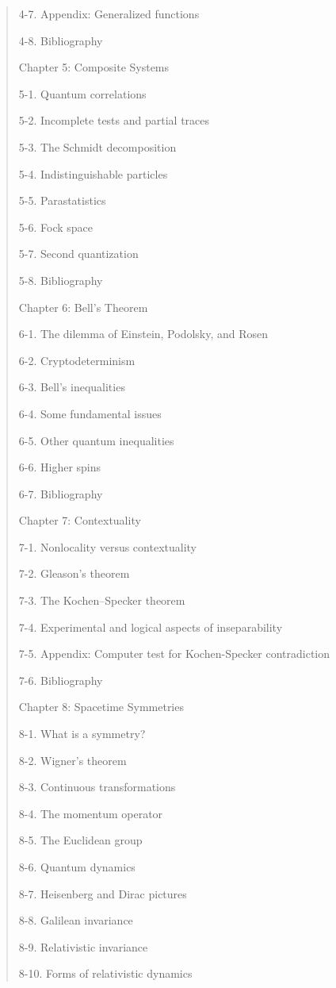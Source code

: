 \documentclass{article}
\begin{document}
\begin{quote}
{4-7. Appendix: Generalized functions 

4-8. Bibliography 

Chapter 5: Composite Systems

5-1. Quantum correlations 

5-2. Incomplete tests and partial traces 

5-3. The Schmidt decomposition 

5-4. Indistinguishable particles 

5-5. Parastatistics 

5-6. Fock space 

5-7. Second quantization 

5-8. Bibliography 

Chapter 6: Bell's Theorem

6-1. The dilemma of Einstein, Podolsky, and Rosen 

6-2. Cryptodeterminism 

6-3. Bell's inequalities 

6-4. Some fundamental issues 

6-5. Other quantum inequalities 

6-6. Higher spins 

6-7. Bibliography 

Chapter 7: Contextuality

7-1. Nonlocality versus contextuality 

7-2. Gleason's theorem 

7-3. The Kochen--Specker theorem 

7-4. Experimental and logical aspects of inseparability 

7-5. Appendix: Computer test for Kochen-Specker contradiction 

7-6. Bibliography 

Chapter 8: Spacetime Symmetries

8-1. What is a symmetry? 

8-2. Wigner's theorem 

8-3. Continuous transformations 

8-4. The momentum operator 

8-5. The Euclidean group 

8-6. Quantum dynamics 

8-7. Heisenberg and Dirac pictures 

8-8. Galilean invariance 

8-9. Relativistic invariance 

8-10. Forms of relativistic dynamics 

}
\end{quote}
\end{document}
